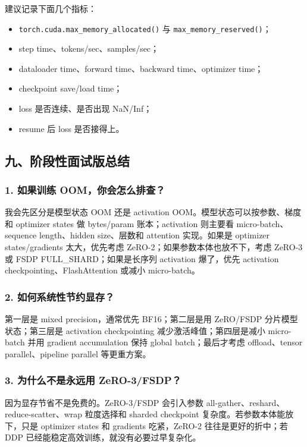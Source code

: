 建议记录下面几个指标：
\begin{itemize}[leftmargin=1.5em]
  \item \texttt{torch.cuda.max\_memory\_allocated()} 与 \texttt{max\_memory\_reserved()}；
  \item step time、tokens/sec、samples/sec；
  \item dataloader time、forward time、backward time、optimizer time；
  \item checkpoint save/load time；
  \item loss 是否连续、是否出现 NaN/Inf；
  \item resume 后 loss 是否接得上。
\end{itemize}

\subsection{九、阶段性面试版总结}

\subsubsection*{1. 如果训练 OOM，你会怎么排查？}

我会先区分是模型状态 OOM 还是 activation OOM。模型状态可以按参数、梯度和 optimizer states 做 bytes/param 账本；activation 则主要看 micro-batch、sequence length、hidden size、层数和 attention 实现。如果是 optimizer states/gradients 太大，优先考虑 ZeRO-2；如果参数本体也放不下，考虑 ZeRO-3 或 FSDP FULL\_SHARD；如果是长序列 activation 爆了，优先 activation checkpointing、FlashAttention 或减小 micro-batch。

\subsubsection*{2. 如何系统性节约显存？}

第一层是 mixed precision，通常优先 BF16；第二层是用 ZeRO/FSDP 分片模型状态；第三层是 activation checkpointing 减少激活峰值；第四层是减小 micro-batch 并用 gradient accumulation 保持 global batch；最后才考虑 offload、tensor parallel、pipeline parallel 等更重方案。

\subsubsection*{3. 为什么不是永远用 ZeRO-3/FSDP？}

因为显存节省不是免费的。ZeRO-3/FSDP 会引入参数 all-gather、reshard、reduce-scatter、wrap 粒度选择和 sharded checkpoint 复杂度。若参数本体能放下，只是 optimizer states 和 gradients 吃紧，ZeRO-2 往往是更好的折中；若 DDP 已经能稳定高效训练，就没有必要过早复杂化。

